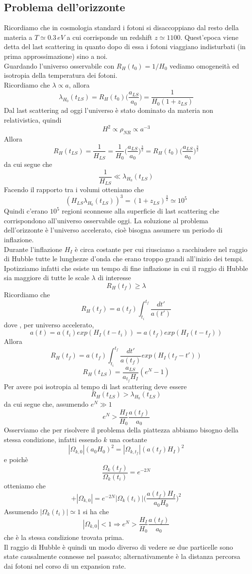 \documentclass[10pt,a4paper]{article}
\theoremstyle{break}
\theoremstyle{remark}
\theoremstyle{definition}
\newcommand{\ra}{\Rightarrow}
\begin{document}
\subsection{Problema dell'orizzonte}
Ricordiamo che in cosmologia standard i fotoni si disaccoppiano dal resto della materia a $T \simeq 0.3\,eV$ a cui corrisponde un redshift $z\simeq1100$. Quest'epoca viene detta del last scattering in quanto dopo di essa i fotoni viaggiano indisturbati (in prima approssimazione) sino a noi.\\
Guardando l'universo osservabile con $R_H(t_0) = 1/H_0$ vediamo omogeneità ed isotropia della temperatura dei fotoni.\\
Ricordiamo che $\lambda \propto a$, allora
\[
\lambda_{H_0}(t_{LS}) = R_H(t_0) \bigg(\frac{a_{LS}}{a_0}\bigg) = \frac{1}{H_0(1 + z_{LS})}
\]
Dal last scattering ad oggi l'universo è stato dominato da materia non relativistica, quindi
\[
H^2 \propto \rho_{NR} \propto a^{-3}
\]
Allora
\[
R_H(t_{LS}) = \frac{1}{H_{LS}} = \frac{1}{H_0} \bigg(\frac{a_{LS}}{a_0}\bigg)^\frac32 = R_H(t_0) \bigg(\frac{a_{LS}}{a_0}\bigg)^\frac32
\]
da cui segue che 
\[
\frac{1}{H_{LS}} \ll \lambda_{H_0}(t_{LS})
\]
Facendo il rapporto tra i volumi otteniamo che
\[
(H_{LS}\lambda_{H_0}(t_{LS}))^3 = (1 + z_{LS})^\frac32 \simeq 10^5
\]
Quindi c'erano $10^5$ regioni sconnesse alla superficie di last scattering che corrispondono all'universo osservabile oggi. La soluzione al problema dell'orizzonte è l'universo accelerato, cioè bisogna assumere un periodo di inflazione.\\
Durante l'inflazione $H_I$ è circa costante per cui riusciamo a racchiudere nel raggio di Hubble tutte le lunghezze d'onda che erano troppo grandi all'inizio dei tempi.\\
Ipotizziamo infatti che esiste un tempo di fine inflazione in cui il raggio di Hubble sia maggiore di tutte le scale $\lambda$ di interesse
\[
R_H(t_f) \ge \lambda
\]
Ricordiamo che
\[
R_H(t_f) = a(t_f) \int_{t_i}^{t_f}\frac{dt'}{a(t')}
\]
dove , per universo accelerato,
\[
a(t)  = a(t_i)exp(H_I(t - t_i)) = a(t_f)exp(H_I(t - t_f))
\]
Allora
\[
R_H(t_f) = a(t_f) \int_{t_i}^{t_f}\frac{dt'}{a(t_f)}exp(H_I(t_f - t'))
\]
\[
R_H(t_{LS}) = \frac{a_{LS}}{a_{t_f}H_I}(e^N - 1)
\]
Per avere poi isotropia al tempo di last scattering deve essere
\[
R_H(t_{LS}) > \lambda_{H_0}(t_{LS})
\]
da cui segue che, assumendo $e^N \gg 1$
\[
\boxed{
e^N > \frac{H_I}{H_0}\frac{a(t_f)}{a_0}
}
\]
Osserviamo che per risolvere il problema della piattezza abbiamo bisogno della stessa condizione, infatti essendo $k$ una costante
\[
|\Omega_{k, 0}|(a_0 H_0)^2 = |\Omega_{k, t_f}|(a(t_f) H_I)^2
\]
e poichè
\[
\frac{\Omega_k(t_f)}{\Omega_k(t_i)} = e^{-2N}
\]
otteniamo che
\[+
|\Omega_{k, 0}| = e^{-2N}|\Omega_k(t_i)| \bigg(\frac{a(t_f)H_I}{a_0 H_0}\bigg)^2
\]
Assumendo $|\Omega_k(t_i)|\simeq 1$ si ha che
\[
|\Omega_{k, 0}| < 1 \ra e^N > \frac{H_I}{H_0}\frac{a(t_f)}{a_0}
\]
che è la stessa condizione trovata prima.\\
Il raggio di Hubble è quindi un modo diverso di vedere se due particelle sono state causalmente connesse nel passato; alternativamente è la distanza percorsa dai fotoni nel corso di un expansion rate.
\end{document}
